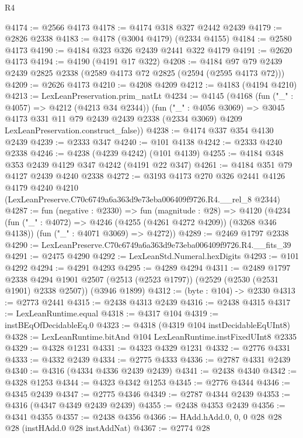 \begin{lexlean}{R4}
\begin{coremodule}
@4174 := @2566 @4173
@4178 := @4174 @318 @327 @2442 @2439
@4179 := @2826 @2338
@4183 := @4178 (@3004 @4179) (@2334 @4155)
@4184 := @2580 @4173
@4190 := @4184 @323 @326 @2439 @2441 @322 @4179
@4191 := @2620 @4173
@4194 := @4190 (@4191 @17 @322)
@4208 := @4184 @97 @79 @2439 @2439 @2825 @2338 (@2589 @4173 @72 @2825 (@2594 (@2595 @4173 @72)))
@4209 := @2626 @4173
@4210 := @4208 @4209
@4212 := @4183 (@4194 @4210)
@4213 := LexLeanPreservation.prim_natLt
@4234 := @4145
    (@4168
      (fun ("_" : @4057) => @4212 (@4213 @34 @2344))
      (fun ("_" : @4056 @3069) =>
      @3045
        @4173
        @331
        @11
        @79
        @2439
        @2439
        @2338
        (@2334 @3069)
        @4209
        LexLeanPreservation.construct_false))
@4238 := @4174 @337 @354 @4130 @2439
@4239 := @2333 @347
@4240 := @101 @4138
@4242 := @2333 @4240 @2338
@4246 := @4238 (@4239 @4242) (@101 @4139)
@4255 := @4184 @348 @353 @2439 @4129 @347 @4242 (@4191 @22 @347)
@4261 := @4184 @351 @79 @4127 @2439 @4240 @2338
@4272 := @3193
    @4173
    @270
    @326
    @2441
    @4126
    @4179
    @4240
    @4210
    (LexLeanPreserve.C70c6749a6a363d9e73eba006409f9726.R4.__rel_8 @2344)
@4287 := fun (negative : @2330) =>
  fun (magnitude : @28) =>
  @4120
    (@4234
      (fun ("_" : @4072) => @4246 (@4255 (@4261 @4272 @4209)) (@3268 @346 @4138))
      (fun ("_" : @4071 @3069) => @4272))
@4289 := @2469 @1797 @2338
@4290 := LexLeanPreserve.C70c6749a6a363d9e73eba006409f9726.R4.__fits_39
@4291 := @2475 @4290
@4292 := LexLeanStd.Numeral.hexDigits
@4293 := @101 @4292
@4294 := @4291 @4293
@4295 := @4289 @4294
@4311 := @2489
    @1797
    @2338
    @4294
    @1901
    @2507
    (@2513 (@2523 @1797))
    (@2529 (@2530 (@2531 @1901) @2338 @2507))
    (@3946 @1899)
@4312 := (byte : @104) -> @2330
@4313 := @2773 @2441
@4315 := @2438 @4313 @2439
@4316 := @2438 @4315
@4317 := LexLeanRuntime.equal
@4318 := @4317 @104
@4319 := instBEqOfDecidableEq.{0}
@4323 := @4318 (@4319 @104 instDecidableEqUInt8)
@4328 := LexLeanRuntime.bitAnd @104 LexLeanRuntime.instFixedUInt8 @2335
@4329 := @4328 @1231
@4331 := @4323 @4329 @1231
@4332 := @2776 @4331
@4333 := @4332 @2439
@4334 := @2775 @4333
@4336 := @2787 @4331 @2439
@4340 := @4316 (@4334 @4336 @2439 @2439)
@4341 := @2438 @4340
@4342 := @4328 @1253
@4344 := @4323 @4342 @1253
@4345 := @2776 @4344
@4346 := @4345 @2439
@4347 := @2775 @4346
@4349 := @2787 @4344 @2439
@4353 := @4316 (@4347 @4349 @2439 @2439)
@4355 := @2438 @4353 @2439
@4356 := @4341 @4355
@4357 := @2438 @4356
@4366 := HAdd.hAdd.{0, 0, 0} @28 @28 @28 (instHAdd.{0} @28 instAddNat)
@4367 := @2774 @28

\end{coremodule}
\end{lexlean}
